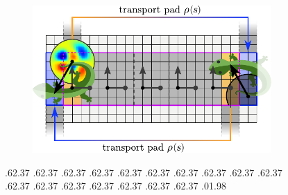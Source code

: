 \begin{figure}
    \begin{subfigure}[t!]{.6\linewidth}
        \includegraphics[width=\linewidth]{figures/mobius_conv_numerical.pdf}
    \end{subfigure}
    \par
    \vspace*{\dimexpr-\parskip-160.pt\relax}%
        .62\textwidth .37\textwidth %
        .62\textwidth .37\textwidth
        .62\textwidth .37\textwidth
        .62\textwidth .37\textwidth
        .62\textwidth .37\textwidth
        .62\textwidth .37\textwidth
        .62\textwidth .37\textwidth
        .62\textwidth .37\textwidth
        .62\textwidth .37\textwidth
        .62\textwidth .37\textwidth
        .62\textwidth .37\textwidth
        .62\textwidth .37\textwidth
        .62\textwidth .37\textwidth
        .62\textwidth .37\textwidth
        .62\textwidth .37\textwidth
        .62\textwidth .37\textwidth
        .62\textwidth .37\textwidth
        .01\textwidth .98\textwidth %
    \makeatletter

\end{figure}
